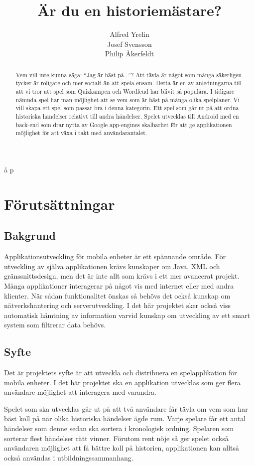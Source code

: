 å p\documentclass[swedish,12pt,a4paper]{article}
\author{Alfred Yrelin\\Josef Svensson\\Philip Åkerfeldt}
\title{Är du en historiemästare?}
\begin{document}
\maketitle
\newpage
\begin{abstract}
Vem vill inte kunna säga: ``Jag är bäst på...''? Att tävla är något som många säkerligen tycker är roligare och mer socialt än att spela ensam. Detta är en av anledningarna till att vi tror att spel som Quizkampen och Wordfeud har blivit så populära. I tidigare nämnda spel har man möjlighet att se vem som är bäst på många olika spelplaner. Vi vill skapa ett spel som passar bra i denna kategorin. Ett spel som går ut på att ordna historiska händelser relativt till andra händelser. Spelet utvecklas till Android med en back-end som drar nytta av Google app-engines skalbarhet för att ge applikationen möjlighet för att växa i takt med användarantalet. 

\end{abstract}
\pagebreak
\section{Förutsättningar}
\subsection{Bakgrund}
Applikationsutveckling för mobila enheter är ett spännande område. För utveckling av själva applikationen krävs kunskaper om Java, XML och gränssnittsdesign, men det är inte allt som krävs i ett mer avancerat projekt. Många applikationer interagerar på något vis med internet eller med andra klienter. När sådan funktionalitet önskas så behövs det också kunskap om nätverkshantering och serverutveckling. I det här projektet sker också viss automatisk hämtning av information varvid kunskap om utveckling av ett smart system som filtrerar data behövs.

\subsection{Syfte}
Det är projektets syfte är att utveckla och distribuera en spelapplikation för mobila enheter. I det här projektet ska en applikation utvecklas som ger flera användare möjlighet att interagera med varandra.

Spelet som ska utvecklas går ut på att två användare får tävla om vem som har bäst koll på när olika historiska händelser ägde rum. Varje spelare får ett antal händelser som denne sedan ska sortera i kronologisk ordning. Spelaren som sorterar flest händelser rätt vinner. Förutom rent nöje så ger spelet också användaren möjlighet att få bättre koll på historien, applikationen kan alltså också användas i utbildningssammanhang.
\end{document}
